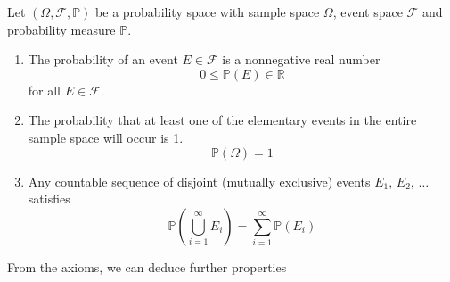 \documentclass[11pt]{report} %
\begin{document}
Let $\left(\Omega, \mathcal{F}, \mathbb{P}\right)$ be a probability space with sample space $\Omega$, event space $\mathcal{F}$ and probability measure $\mathbb{P}$.
\begin{enumerate}
\item The probability of an event $E \in \mathcal{F}$ is a nonnegative real number
\begin{equation}
0 \leq \mathbb{P}\left(E\right) \in \mathbb{R}
\end{equation}
for all $E \in \mathcal{F}$.
\item The probability that at least one of the elementary events in the entire sample space will occur is 1.
\begin{equation}
\mathbb{P}\left(\Omega\right) = 1
\end{equation}
\item Any countable sequence of disjoint (mutually exclusive) events $E_{1}$, $E_{2}$, $\dots$ satisfies
\begin{equation}
\mathbb{P}\left(\bigcup_{i = 1}^{\infty}E_{i}\right) = \sum_{i = 1}^{\infty}\mathbb{P}\left(E_{i}\right)
\end{equation}
\end{enumerate}
From the axioms, we can deduce further properties
\end{document}
